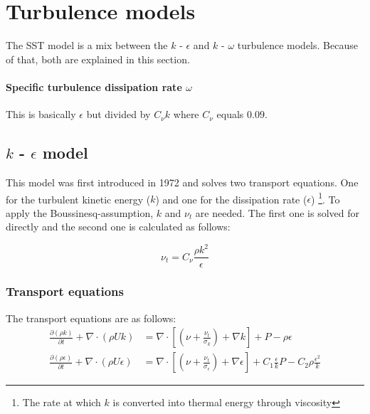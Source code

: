 \section{Turbulence models}
\label{sec:turb_models}
The SST model is a mix between the $k$ - $\epsilon$ and $k$ - $\omega$
turbulence models. Because of that, both are explained in this section. 

\paragraph{Specific turbulence dissipation rate $\omega$}
This is basically $\epsilon$ but divided by $C_{\nu} k$ where $C_{\nu}$ equals
$0.09$.




\subsection{$k$ - $\epsilon$ model}
This model was first introduced in 1972 and solves two transport equations.
\cite{JONES1972301} One for the turbulent kinetic energy ($k$) and one for the
dissipation rate ($\epsilon$) \footnote{The rate at which $k$ is converted into
thermal energy through viscosity}. To apply the Boussinesq-assumption, $k$ and
$\nu_t$ are needed. The first one is solved for directly and the second one is
calculated as follows:

\begin{equation}
    \label{eq:k_epsilon_nu_t}
    \nu_t = C_{\nu} \frac{\rho k^2}{\epsilon}
\end{equation}


\subsubsection{Transport equations}
\noindent The transport equations are as follows:
\begin{align}
    \label{eq:transport_k}
    \frac{\partial (\rho k)}{\partial t} + 
    \nabla \cdot (\rho U k) &=
    \nabla \cdot \left[ 
        \left( \nu + \frac{\nu_t}{\sigma_k}\right) + \nabla k 
    \right] + P - \rho \epsilon \\
%
    \label{eq:tranport_epsilon}
    \frac{\partial (\rho \epsilon)}{\partial t} + 
    \nabla \cdot (\rho U \epsilon) &=
    \nabla \cdot \left[ 
        \left( \nu + \frac{\nu_t}{\sigma_{\epsilon}}\right) + \nabla  \epsilon
    \right] + C_1 \frac{\epsilon}{k}P - 
    C_2 \rho \frac{\epsilon^2}{k}
\end{align}

